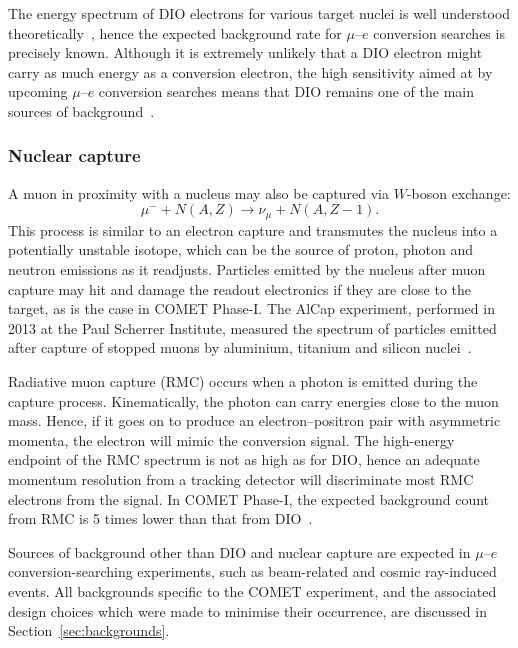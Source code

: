 
The energy spectrum of DIO electrons for various target nuclei is well
understood theoretically~\cite{czarnecki}, hence the expected background rate
for $\mu$--$e$ conversion searches is precisely known. Although it is extremely
unlikely that a DIO electron might carry as much energy as a conversion
electron, the high sensitivity aimed at by upcoming $\mu$--$e$ conversion
searches means that DIO remains one of the main sources of
background~\cite{the_comet_collaboration_comet_2020}.


\subsubsection{Nuclear capture}
A muon in proximity with a nucleus may also be captured via $W$-boson exchange:
\begin{equation*}\label{eq:capture}
    \mu^- + N(A, Z) \rightarrow \nu_\mu + N(A, Z-1).
\end{equation*}
This process is similar to an electron capture and transmutes the nucleus into a
potentially unstable isotope, which can be the source of proton, photon and
neutron emissions as it readjusts. Particles emitted by the nucleus after muon
capture may hit and damage the readout electronics if they are close to the
target, as is the case in COMET Phase-I. The AlCap experiment, performed in 2013
at the Paul Scherrer Institute, measured the spectrum of particles emitted after
capture of stopped muons by aluminium, titanium and silicon
nuclei~\cite{PhysRevC.105.035501}.


Radiative muon capture (RMC) occurs when a photon is emitted during the capture
process. Kinematically, the photon can carry energies close to the muon mass.
Hence, if it goes on to produce an electron--positron pair with asymmetric
momenta, the electron will mimic the conversion signal. The high-energy endpoint
of the RMC spectrum is not as high as for DIO, hence an adequate momentum
resolution from a tracking detector will discriminate most RMC electrons from
the signal. In COMET Phase-I, the expected background count from RMC is 5 times
lower than that from DIO~\cite{the_comet_collaboration_comet_2020}.




Sources of background other than DIO and nuclear capture are expected in
$\mu$--$e$ conversion-searching experiments, such as beam-related and cosmic
ray-induced events. All backgrounds specific to the COMET experiment, and the
associated design choices which were made to minimise their occurrence, are
discussed in Section~\ref{sec:backgrounds}.






